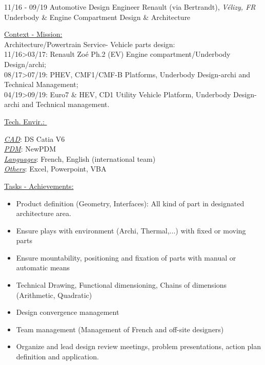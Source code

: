\documentclass[]{friggeri-cv}
\begin{document}
\begin{entrylist}
  \entry
    {11/16 - 09/19}
    {Automotive Design Engineer}
    {Renault (via Bertrandt), \textit{Vélizy, FR}}
    {Underbody \& Engine Compartment Design \& Architecture}
\end{entrylist}
\vspace{-10pt}
\begin{minipage}[t]{0.65\linewidth}
\underline{Context - Mission: }\\
Architecture/Powertrain Service- Vehicle parts design: \\11/16>03/17: Renault Zoé Ph.2 (EV) Engine compartment/Underbody Design/archi;\\08/17>07/19: PHEV, CMF1/CMF-B Platforms, Underbody Design-archi and Technical Management;\\04/19>09/19: Euro7 \& HEV, CD1 Utility Vehicle Platform, Underbody Design-archi and Technical management.\\
\end{minipage} %
\begin{minipage}[t]{0.38\textwidth}
    \underline{Tech. Envir.: }\
    \vspace{1mm}
    
\underline{\textit{CAD}}: DS Catia V6\\
\underline{\textit{PDM}}: NewPDM\\
\underline{\textit{Languages}}: French, English (international team)\\
\underline{\textit{Others}}: Excel, Powerpoint, VBA
\vspace{15mm}
    \end{minipage}
\vspace{1.5mm}
\underline{Tasks - Achievements: }\\

\begin{itemize}
\setlength{\itemsep}{1pt}
\setlength{\parskip}{0pt}
\setlength{\parsep}{0pt}

\item Product definition (Geometry, Interfaces): All kind of part in designated architecture area.
\item Ensure plays with environment (Archi, Thermal,...) with fixed or moving parts
\item Ensure mountability, positioning and fixation of parts with manual or automatic means
\item Technical Drawing, Functional dimensioning, Chains of dimensions (Arithmetic, Quadratic)
\item Design convergence management
\item Team management (Management of French and off-site designers)
\item Organize and lead design review meetings, problem presentations, action plan definition and application.
\end{itemize}
\end{document}
